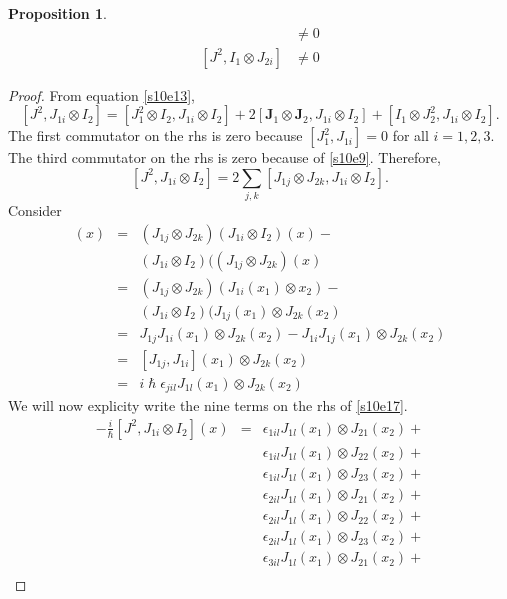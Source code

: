 \documentclass{article}
\numberwithin{equation}{section}
\let\vec\bm
\theoremstyle{plain}
\numberwithin{thm}{section}
\theoremstyle{plain}
\newtheorem{prop}{Proposition}
\numberwithin{prop}{section}
\theoremstyle{definition}
\numberwithin{defn}{section}
\theoremstyle{remark}
\begin{document}
\begin{prop}\label{s10p3}
\begin{eqnarray}
[J^2, J_{1i} \otimes I_2] &\ne 0\label{s10e17}  \\
{}[J^2, I_1 \otimes J_{2i}] &\ne 0\label{s10e18}
\end{eqnarray}
\end{prop}
\begin{proof}
From equation \eqref{s10e13},
\[
[J^2, J_{1i} \otimes I_2] = [J_1^2 \otimes I_2, J_{1i} \otimes I_2] + 
2[\vec{J}_1 \otimes \vec{J}_2, J_{1i} \otimes I_2] + 
[I_1 \otimes J_2^2, J_{1i} \otimes I_2].
\]
The first commutator on the rhs is zero because $[J_1^2, J_{1i}] = 0$ for 
all $i = 1, 2, 3$. The third commutator on the rhs is zero because of 
\eqref{s10e9}. Therefore,
\begin{equation}\label{s10e19}
[J^2, J_{1i} \otimes I_2] = 2\sum_{j,k}[J_{1j} \otimes J_{2k}, J_{1i} 
\otimes I_2].
\end{equation}
Consider
\begin{eqnarray*}
[J_{1j} \otimes J_{2k}, J_{1i} \otimes I_2](x) &=& 
(J_{1j} \otimes J_{2k})(J_{1i} \otimes I_2)(x) -  \\
& & (J_{1i} \otimes I_2)((J_{1j} \otimes J_{2k})(x)  \\
&=& (J_{1j} \otimes J_{2k})(J_{1i}(x_1) \otimes x_2) - \\
& & (J_{1i} \otimes I_2)(J_{1j}(x_1) \otimes J_{2k}(x_2) \\
&=& J_{1j}J_{1i}(x_1)\otimes J_{2k}(x_2)-J_{1i}J_{1j}(x_1)\otimes J_{2k}(x_2) \\
&=& [J_{1j}, J_{1i}](x_1) \otimes J_{2k}(x_2) \\
&=& i\hslash\epsilon_{jil}J_{1l}(x_1) \otimes J_{2k}(x_2)
\end{eqnarray*}
We will now explicity write the nine terms on the rhs of \eqref{s10e17}.
\begin{eqnarray*}
-\frac{i}{\hslash}[J^2, J_{1i} \otimes I_2](x) &=&  
 \epsilon_{1il}J_{1l}(x_1) \otimes J_{21}(x_2) + \\
& & \epsilon_{1il}J_{1l}(x_1) \otimes J_{22}(x_2) + \\
& & \epsilon_{1il}J_{1l}(x_1) \otimes J_{23}(x_2) + \\
& & \epsilon_{2il}J_{1l}(x_1) \otimes J_{21}(x_2) + \\
& & \epsilon_{2il}J_{1l}(x_1) \otimes J_{22}(x_2) + \\
& & \epsilon_{2il}J_{1l}(x_1) \otimes J_{23}(x_2) + \\
& & \epsilon_{3il}J_{1l}(x_1) \otimes J_{21}(x_2) + \\

\end{eqnarray*}
\end{proof}
\end{document}
